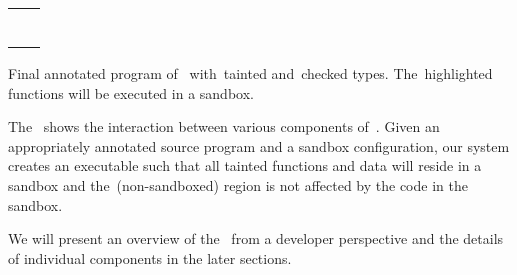 \begin{listing}[t!]
  \begin{tabular}{c c}
    \begin{minipage}[b]{.22\textwidth}
\inputminted[mathescape, escapeinside=||, fontsize=\tiny{}]{c}{examples/conv1.c}
    \end{minipage} &
    \begin{minipage}[b]{.22\textwidth}
\inputminted[mathescape, highlightlines={1-19}, highlightcolor=taintcolor, escapeinside=||, fontsize=\tiny{}]{c}{examples/conv2.c}
    \end{minipage} %
  \end{tabular}
\caption{Final annotated program of~ with~\textcolor{taintcolor}{tainted} and~\textcolor{checkcolor}{checked} types. The~\colorbox{taintcolor}{highlighted} functions will be executed in a sandbox.}
\label{lst:final}
\end{listing}



The~ shows the interaction between various components of~\systemname{}.
Given an appropriately annotated source program and a sandbox configuration, our system creates an executable such that all tainted functions and data will reside in a sandbox and the~\cregion (non-sandboxed) region is not affected by the code in the sandbox.

We will present an overview of the~\systemname{} from a developer perspective and the details of individual components in the later sections.


